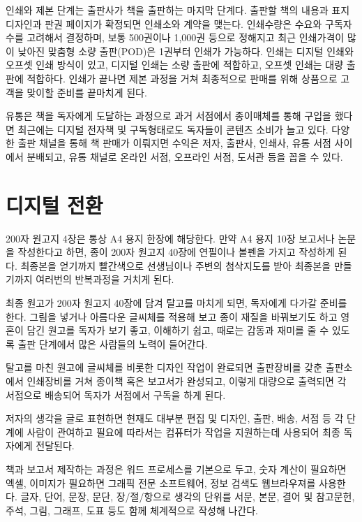 \documentclass[
  letterpaper,
]{book}
\begin{document}
인쇄와 제본 단계는 출판사가 책을 출판하는 마지막 단계다. 출판할 책의
내용과 표지 디자인과 판권 페이지가 확정되면 인쇄소와 계약을 맺는다.
인쇄수량은 수요와 구독자 수를 고려해서 결정하며, 보통 500권이나 1,000권
등으로 정해지고 최근 인쇄가격이 많이 낮아진 맞춤형 소량 출판(POD)은
1권부터 인쇄가 가능하다. 인쇄는 디지털 인쇄와 오프셋 인쇄 방식이 있고,
디지털 인쇄는 소량 출판에 적합하고, 오프셋 인쇄는 대량 출판에 적합하다.
인쇄가 끝나면 제본 과정을 거쳐 최종적으로 판매를 위해 상품으로 고객을
맞이할 준비를 끝마치게 된다.

유통은 책을 독자에게 도달하는 과정으로 과거 서점에서 종이매체를 통해
구입을 했다면 최근에는 디지털 전자책 및 구독형태로도 독자들이 콘텐츠
소비가 늘고 있다. 다양한 출판 채널을 통해 책 판매가 이뤄지면 수익은
저자, 출판사, 인쇄사, 유통 서점 사이에서 분배되고, 유통 채널로 온라인
서점, 오프라인 서점, 도서관 등을 꼽을 수 있다.

\hypertarget{uxb514uxc9c0uxd138-uxc804uxd658}{%
\section{디지털 전환}\label{uxb514uxc9c0uxd138-uxc804uxd658}}

200자 원고지 4장은 통상 A4 용지 한장에 해당한다. 만약 A4 용지 10장
보고서나 논문을 작성한다고 하면, 종이 200자 원고지 40장에 연필이나
볼펜을 가지고 작성하게 된다. 최종본을 얻기까지 빨간색으로 선생님이나
주변의 첨삭지도를 받아 최종본을 만들기까지 여러번의 반복과정을 거치게
된다.

최종 원고가 200자 원고지 40장에 담겨 탈고를 마치게 되면, 독자에게 다가갈
준비를 한다. 그림을 넣거나 아름다운 글씨체를 적용해 보고 종이 재질을
바꿔보기도 하고 영혼이 담긴 원고를 독자가 보기 좋고, 이해하기 쉽고,
때로는 감동과 재미를 줄 수 있도록 출판 단계에서 많은 사람들의 노력이
들어간다.

탈고를 마친 원고에 글씨체를 비롯한 디자인 작업이 완료되면 출판장비를
갖춘 출판소에서 인쇄장비를 거쳐 종이책 혹은 보고서가 완성되고, 이렇게
대량으로 출력되면 각 서점으로 배송되어 독자가 서점에서 구독을 하게 된다.

저자의 생각을 글로 표현하면 현재도 대부분 편집 및 디자인, 출판, 배송,
서점 등 각 단계에 사람이 관여하고 필요에 따라서는 컴퓨터가 작업을
지원하는데 사용되어 최종 독자에게 전달된다.

책과 보고서 제작하는 과정은 워드 프로세스를 기본으로 두고, 숫자 계산이
필요하면 엑셀, 이미지가 필요하면 그래픽 전문 소프트웨어, 정보 검색도
웹브라우져를 사용한다. 글자, 단어, 문장, 문단, 장/절/항으로 생각의
단위를 서문, 본문, 결어 및 참고문헌, 주석, 그림, 그래프, 도표 등도 함께
체계적으로 작성해 나간다.
\end{document}
